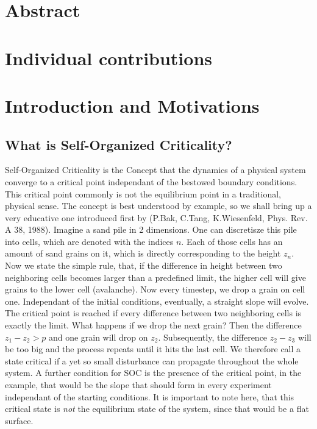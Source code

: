 \documentclass[11pt]{article}
\begin{document}



\section{Abstract}

\section{Individual contributions}

\section{Introduction and Motivations}
\subsection{What is Self-Organized Criticality?}
Self-Organized Criticality is the Concept that the dynamics of a physical system converge to a critical point independant of the bestowed boundary conditions. This critical point commonly is not the equilibrium point in a traditional, physical sense. The concept is best understood by example, so we shall bring up a very educative one introduced first by (P.Bak, C.Tang, K.Wiesenfeld, Phys. Rev. A 38, 1988). 
Imagine a sand pile in 2 dimensions. One can discretisze this pile into cells, which are denoted with the indices $n$. Each of those cells has an amount of sand grains on it, which is directly corresponding to the height $z_{n}$. Now we state the simple rule, that, if the difference in height between two neighboring cells becomes larger than a predefined limit, the higher cell will give grains to the lower cell (avalanche). Now every timestep, we drop a grain on cell one. Independant of the initial conditions, eventually, a straight slope will evolve. The critical point is reached if every difference between two neighboring cells is exactly the limit. What happens if we drop the next grain? Then the difference $z_{1}-z_{2}>p$ and one grain will drop on $z_{2}$. Subsequently, the difference $z_{2}-z_{3}$ will be too big and the process repeats until it hits the last cell. We therefore call a state critical if a yet so small disturbance can propagate throughout the whole system. A further condition for SOC is the presence of the critical point, in the example, that would be the slope that should form in every experiment independant of the starting conditions. 
It is important to note here, that this critical state is \emph{not} the equilibrium state of the system, since that would be a flat surface. 
\end{document}

